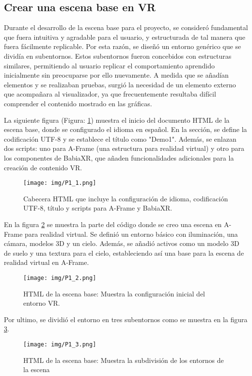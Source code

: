 \documentclass[a4paper, 12pt]{book}
\begin{document}
        \subsection{Crear una escena base en VR}
        
        Durante el desarrollo de la escena base para el proyecto, se consideró fundamental que fuera intuitiva y agradable para el usuario, y estructurada de tal manera que fuera fácilmente replicable. Por esta razón, se diseñó un entorno genérico que se dividía en subentornos. Estos subentornos fueron concebidos con estructuras similares, permitiendo al usuario replicar el comportamiento aprendido inicialmente sin preocuparse por ello nuevamente. A medida que se añadían elementos y se realizaban pruebas, surgió la necesidad de un elemento externo que acompañara al visualizador, ya que frecuentemente resultaba difícil comprender el contenido mostrado en las gráficas.

        La siguiente figura (Figura: \ref{fig:P1_1}) muestra el inicio del  documento HTML de la escena base, donde se configurado el idioma en español. En la sección, se define la codificación UTF-8 y se establece el título como "Demo1". Además, se enlazan dos scripts: uno para A-Frame (una estructura para realidad virtual) y otro para los componentes de BabiaXR, que añaden funcionalidades adicionales para la creación de contenido VR.
        \begin{figure}[H]
            \centering
            \texttt{[image: img/P1\_1.png]}
            \caption{Cabecera HTML que incluye la configuración de idioma, codificación UTF-8, título y scripts para A-Frame y BabiaXR.}
            \label{fig:P1_1}
        \end{figure}
        
        En la figura \ref{fig:P1_2} se muestra la parte del código donde se creo una escena en A-Frame para realidad virtual. Se definió un entorno básico con iluminación, una cámara, modelos 3D y un cielo. Además, se añadió activos como un modelo 3D de suelo y una textura para el cielo, estableciendo así una base para la escena de realidad virtual en A-Frame.
        \begin{figure}[H]
            \centering
            \texttt{[image: img/P1\_2.png]}
            \caption{HTML de la escena base: Muestra la configuración inicial del entorno VR.}
            \label{fig:P1_2}
        \end{figure}

        Por ultimo, se dividió el entorno en tres subentornos como se muestra en la figura \ref{fig:P1_3}.
        \begin{figure}
            \centering
            \texttt{[image: img/P1\_3.png]}
            \caption{HTML de la escena base: Muestra la subdivisión de los entornos de la escena}
            \label{fig:P1_3}
        \end{figure}
        
\end{document}
